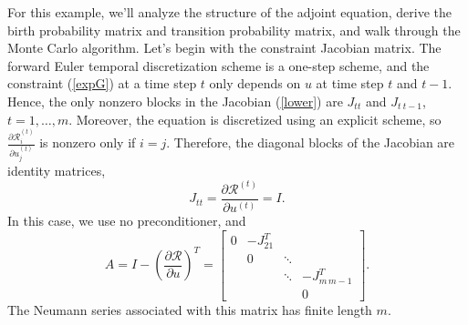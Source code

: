    For this example, we'll analyze the structure of the adjoint
    equation, derive the birth probability matrix and transition
    probability matrix, and walk through the Monte Carlo algorithm.
    Let's begin with the constraint Jacobian matrix.  The
    forward Euler temporal discretization scheme is a one-step scheme,
    and the constraint (\ref{expG}) at a time step $t$ only depends on
    $u$ at time step $t$ and $t-1$.  Hence, the only nonzero blocks in
    the Jacobian (\ref{lower}) are $J_{t t}$ and $J_{t\: t-1}$,
    $t=1,\ldots,m$.  Moreover, the equation is discretized using an explicit
    scheme, so $\frac{\partial \mathcal{R}_i^{(t)}}{\partial u_j^{(t)}}$ is
    nonzero only if $i=j$.  Therefore, the diagonal blocks of the
    Jacobian are identity matrices,
    $$ J_{t t} = \frac{\partial \mathcal{R}^{(t)}}{\partial u^{(t)}} = I. $$
    In this case, we use no preconditioner, and
    \[ A = I - \left( \frac{\partial \mathcal{R}}{\partial u} \right)^T =
    \begin{bmatrix}
    0        & -J_{2 1}^T &        & \\
             & 0          & \ddots & \\
             &            & \ddots & -J_{m\, m-1}^T \\
             &            &        & 0
    \end{bmatrix}. \]
    The Neumann series associated with this matrix has finite length $m$.
    
